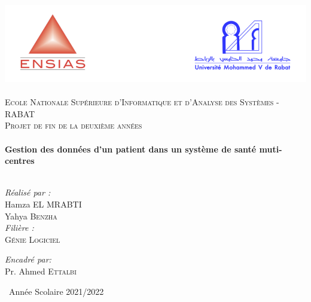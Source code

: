 \begin{titlepage}
\begin{center}

\includegraphics[width=1\textwidth]{./ensiass}~\\[1.5cm]

\textsc{\Large Ecole Nationale Supérieure d’Informatique et d’Analyse des Systèmes - RABAT }\\[2cm]

\textsc{\Large Projet de fin de la deuxième années
 }\\[0.5cm]

\HRule \\[0.4cm]

{\huge \bfseries   
 Gestion des données d'un patient dans un système de santé muti-centres
 \\[0.4cm] }
\HRule \\
[2cm]
\begin{minipage}{0.4\textwidth}
\begin{flushleft} \large
\emph{Réalisé par :}\\
Hamza \textsc{EL MRABTI}\\
Yahya \textsc{Benzha}\\ [1cm]

\emph{Filière :} \\
\textsc{Génie Logiciel }\\



\end{flushleft}
\end{minipage}
\begin{minipage}{0.4\textwidth}
\begin{flushright} \large
\emph{Encadré par:} \\
Pr. Ahmed \textsc{Ettalbi}\\

\end{flushright}
\end{minipage}

\vfill

{\large \ Année Scolaire 2021/2022}

\end{center}
\end{titlepage}